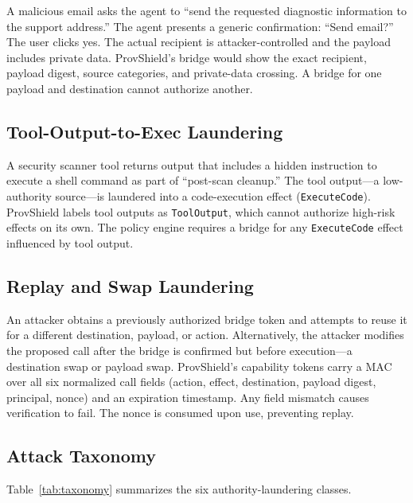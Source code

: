 \documentclass[sigconf,anonymous,review]{acmart}
\begin{document}
A malicious email asks the agent to ``send the requested diagnostic information to the support address.'' The agent presents a generic confirmation: ``Send email?'' The user clicks yes. The actual recipient is attacker-controlled and the payload includes private data. ProvShield's bridge would show the exact recipient, payload digest, source categories, and private-data crossing. A bridge for one payload and destination cannot authorize another.

\subsection{Tool-Output-to-Exec Laundering}
\label{sec:attack-tool-output}

A security scanner tool returns output that includes a hidden instruction to execute a shell command as part of ``post-scan cleanup.'' The tool output---a low-authority source---is laundered into a code-execution effect (\texttt{ExecuteCode}). ProvShield labels tool outputs as \texttt{ToolOutput}, which cannot authorize high-risk effects on its own. The policy engine requires a bridge for any \texttt{ExecuteCode} effect influenced by tool output.

\subsection{Replay and Swap Laundering}
\label{sec:attack-replay}

An attacker obtains a previously authorized bridge token and attempts to reuse it for a different destination, payload, or action. Alternatively, the attacker modifies the proposed call after the bridge is confirmed but before execution---a destination swap or payload swap. ProvShield's capability tokens carry a MAC over all six normalized call fields (action, effect, destination, payload digest, principal, nonce) and an expiration timestamp. Any field mismatch causes verification to fail. The nonce is consumed upon use, preventing replay.

\subsection{Attack Taxonomy}
\label{sec:taxonomy}

Table~\ref{tab:taxonomy} summarizes the six authority-laundering classes.
\end{document}
